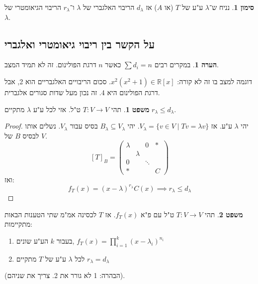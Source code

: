\documentclass[a4paper]{article}
\newcommand\R     {\mathbb{R}}
\newcommand\F         {\mathbb{F}}
\newcommand\co        {\colon}
\newcommand\pms[1]    {\begin{pmatrix}
		#1
\end{pmatrix}}
\renewcommand\lg      {\lambda}
\theoremstyle{definition}
\newtheorem{Theorem}{\color{myblue}משפט}
\newtheorem{Remark}{\color{mycyan}הערה}
\newtheorem{Notion}{\color{myred}סימון}
\newcommand\theo  [1] {\begin{Theorem}#1\end{Theorem}}
\newcommand\rmark [1] {\begin{Remark}#1\end{Remark}}
\newcommand\noti  [1] {\begin{Notion}#1\end{Notion}}
\begin{document}
	\noti{נניח ש־$\lg$ ע"ע של $T$ (או $A$) אז $d_\lg$ הריבוי האלגברי של $\lg$ ו־$r_\lg$ הריבוי הגיאומטרי של $\lg$. }
	\subsection{על הקשר בין ריבוי גיאומטרי ואלגברי}
	
%		
	\rmark{במקרים רבים $\sum d_i = n$ כאשר $n$ דרגת הפולינום. זה לא תמיד המצב. 
	
	דוגמה למצב בו זה לא קורה: $x^2(x^2 + 1) \in \R[x]$. סכום הריבויים האלגבריים הוא 2, אבל דרגת הפולינום היא 4. זה נכון מעל שדות סגורים אלגברית. }
	
	
	\theo{תהי $T \co V \to V$ ט"ל. אזי לכל ע"ע $\lg$ מתקיים $r_\lg \le d_\lg$. }
	\begin{proof}
		יהי $\lg$ ע"ע. אז $V_\lg = \{v \in V \mid Tv = \lg v\}$. יהי $B_\lg \subseteq V_\lg$ בסיס עבור $V_\lg$. נשלים אותו לבסיס $B$ של $V$. 
		\[ [T]_B = \pms{\lg & & 0 & * \\ & \lg &  & \\ 0 && \ddots & \\ *&&& C} \]
		ואז: 
		\[ f_T(x) = (x - \lg)^{r_\lg}C(x) \implies r_\lg \le d_\lg \]
	\end{proof}
	
	\theo{תהי $T \co V \to V$ ט"ל עם פ"א $f_T(x)$. אז $T$ לכסינה אמ"מ שתי הטענות הבאות מתקיימות:
		\begin{enumerate}
			\item בעבור $k$ הע"ע שונים, $f_T(x) = \prod_{i = 1}^{k}(x - \lg_i)^{n_i}$
			\item לכל $\lg$ ע"ע של $T$ מתקיים $r_\lg = d_\lg$
		\end{enumerate}
	}
	(הבהרה: 1 לא גורר את 2. צריך את שניהם). 
	
\end{document}
